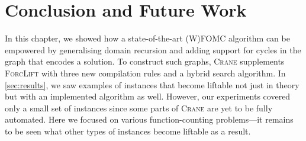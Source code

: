 \section{Conclusion and Future Work}


In this chapter, we showed how a state-of-the-art (W)FOMC algorithm can be
empowered by generalising domain recursion and adding support for cycles in the
graph that encodes a solution. To construct such graphs, \textsc{Crane}
supplements \textsc{ForcLift} \citep{DBLP:conf/ijcai/BroeckTMDR11} with three
new compilation rules and a hybrid search algorithm. In \cref{sec:results}, we
saw examples of instances that become liftable not just in theory
\citep{DBLP:journals/jair/Kuzelka21} but with an implemented algorithm as well.
However, our experiments covered only a small set of instances since some parts
of \textsc{Crane} are yet to be fully automated. Here we focused on various
function-counting problems---it remains to be seen what other types of instances
become liftable as a result.



